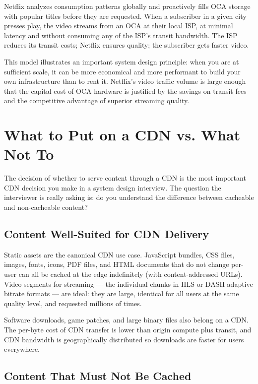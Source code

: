 \documentclass[11pt,a4paper]{article}
\begin{document}
Netflix analyzes consumption patterns globally and proactively fills OCA storage with popular titles before they are requested. When a subscriber in a given city presses play, the video streams from an OCA at their local ISP, at minimal latency and without consuming any of the ISP's transit bandwidth. The ISP reduces its transit costs; Netflix ensures quality; the subscriber gets faster video.

This model illustrates an important system design principle: when you are at sufficient scale, it can be more economical and more performant to build your own infrastructure than to rent it. Netflix's video traffic volume is large enough that the capital cost of OCA hardware is justified by the savings on transit fees and the competitive advantage of superior streaming quality.

\section{What to Put on a CDN vs. What Not To}

The decision of whether to serve content through a CDN is the most important CDN decision you make in a system design interview. The question the interviewer is really asking is: do you understand the difference between cacheable and non-cacheable content?

\subsection{Content Well-Suited for CDN Delivery}

Static assets are the canonical CDN use case. JavaScript bundles, CSS files, images, fonts, icons, PDF files, and HTML documents that do not change per-user can all be cached at the edge indefinitely (with content-addressed URLs). Video segments for streaming --- the individual chunks in HLS or DASH adaptive bitrate formats --- are ideal: they are large, identical for all users at the same quality level, and requested millions of times.

Software downloads, game patches, and large binary files also belong on a CDN. The per-byte cost of CDN transfer is lower than origin compute plus transit, and CDN bandwidth is geographically distributed so downloads are faster for users everywhere.

\subsection{Content That Must Not Be Cached}
\end{document}
